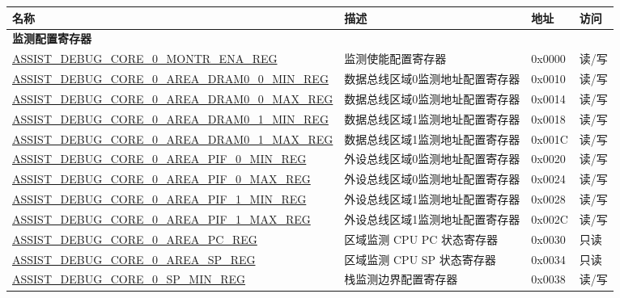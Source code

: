 \begin{longtable}{ | l| m{3.2cm} | l | l | }
\hline\rowcolor{lightgray}
{\bfseries 名称} & {\bfseries 描述} &  {\bfseries 地址} & {\bfseries 访问} \\ \hline
\endhead
\multicolumn{4}{|l|}{\textbf{监测配置寄存器}} \\ \hline
\hyperref[regdesc:ASSISTDEBUGCORE0MONTRENAREG]{ASSIST\_DEBUG\_CORE\_0\_MONTR\_ENA\_REG} & 监测使能配置寄存器 & 0x0000 & 读/写 \\ \hline
\hyperref[regdesc:ASSISTDEBUGCORE0AREADRAM00MINREG]{ASSIST\_DEBUG\_CORE\_0\_AREA\_DRAM0\_0\_MIN\_REG} & 数据总线区域0监测地址配置寄存器 & 0x0010 & 读/写 \\ \hline
\hyperref[regdesc:ASSISTDEBUGCORE0AREADRAM00MAXREG]{ASSIST\_DEBUG\_CORE\_0\_AREA\_DRAM0\_0\_MAX\_REG} & 数据总线区域0监测地址配置寄存器 & 0x0014 & 读/写 \\ \hline
\hyperref[regdesc:ASSISTDEBUGCORE0AREADRAM01MINREG]{ASSIST\_DEBUG\_CORE\_0\_AREA\_DRAM0\_1\_MIN\_REG} & 数据总线区域1监测地址配置寄存器 & 0x0018 & 读/写 \\ \hline
\hyperref[regdesc:ASSISTDEBUGCORE0AREADRAM01MAXREG]{ASSIST\_DEBUG\_CORE\_0\_AREA\_DRAM0\_1\_MAX\_REG} & 数据总线区域1监测地址配置寄存器 & 0x001C & 读/写 \\ \hline
\hyperref[regdesc:ASSISTDEBUGCORE0AREAPIF0MINREG]{ASSIST\_DEBUG\_CORE\_0\_AREA\_PIF\_0\_MIN\_REG} & 外设总线区域0监测地址配置寄存器 & 0x0020 & 读/写 \\ \hline
\hyperref[regdesc:ASSISTDEBUGCORE0AREAPIF0MAXREG]{ASSIST\_DEBUG\_CORE\_0\_AREA\_PIF\_0\_MAX\_REG} & 
外设总线区域0监测地址配置寄存器 & 0x0024 & 读/写 \\ \hline
\hyperref[regdesc:ASSISTDEBUGCORE0AREAPIF1MINREG]{ASSIST\_DEBUG\_CORE\_0\_AREA\_PIF\_1\_MIN\_REG} & 外设总线区域1监测地址配置寄存器 & 0x0028 & 读/写 \\ \hline
\hyperref[regdesc:ASSISTDEBUGCORE0AREAPIF1MAXREG]{ASSIST\_DEBUG\_CORE\_0\_AREA\_PIF\_1\_MAX\_REG} & 外设总线区域1监测地址配置寄存器 & 0x002C & 读/写 \\ \hline
\hyperref[regdesc:ASSISTDEBUGCORE0AREAPCREG]{ASSIST\_DEBUG\_CORE\_0\_AREA\_PC\_REG} & 区域监测 CPU PC 状态寄存器 & 0x0030 & 只读 \\ \hline
\hyperref[regdesc:ASSISTDEBUGCORE0AREASPREG]{ASSIST\_DEBUG\_CORE\_0\_AREA\_SP\_REG} & 区域监测 CPU SP 状态寄存器 & 0x0034 & 只读 \\ \hline
\hyperref[regdesc:ASSISTDEBUGCORE0SPMINREG]{ASSIST\_DEBUG\_CORE\_0\_SP\_MIN\_REG} & 栈监测边界配置寄存器 & 0x0038 &读/写 \\ \hline

\end{longtable}
